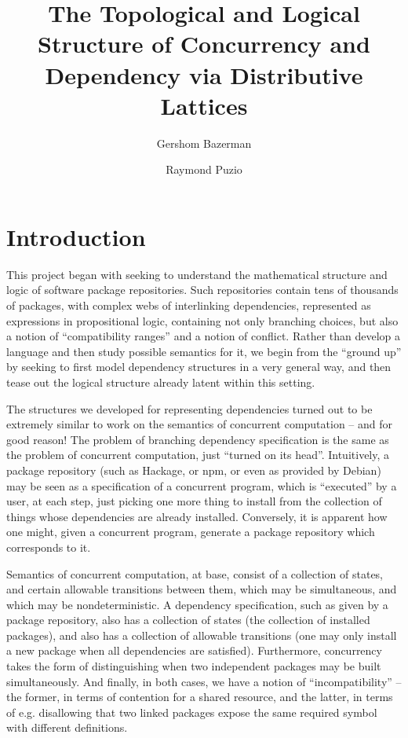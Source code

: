 \documentclass[hoptionsi,review,screen,format=acmsmall]{acmart}
\title[Concurrency and Dependency via Distributive Lattices]{The Topological and Logical Structure of Concurrency and Dependency via Distributive Lattices}
\author{Gershom Bazerman}
\affiliation{%
   \institution{Awake Security}}
\author{Raymond Puzio}
\affiliation{%
   \institution{Albert Einstein Institute}}
\theoremstyle{definition}
\begin{document}
\maketitle

\section{Introduction}
This project began with seeking to understand the mathematical structure and logic of software package repositories. Such repositories contain tens of thousands of packages, with complex webs of interlinking dependencies, represented as expressions in propositional logic, containing not only branching choices, but also a notion of ``compatibility ranges'' and a notion of conflict. Rather than develop a language and then study possible semantics for it, we begin from the ``ground up'' by seeking to first model dependency structures in a very general way, and then tease out the logical structure already latent within this setting.

The structures we developed for representing dependencies turned out to be extremely similar to work on the semantics of concurrent computation -- and for good reason! The problem of branching dependency specification is the same as the problem of concurrent computation, just ``turned on its head''. Intuitively, a package repository (such as Hackage, or npm, or even as provided by Debian) may be seen as a specification of a concurrent program, which is ``executed'' by a user, at each step, just picking one more thing to install from the collection of things whose dependencies are already installed. Conversely, it is apparent how one might, given a concurrent program, generate a package repository which corresponds to it.

Semantics of concurrent computation, at base, consist of a collection of states, and certain allowable transitions between them, which may be simultaneous, and which may be nondeterministic. A dependency specification, such as given by a package repository, also has a collection of states (the collection of installed packages), and also has a collection of allowable transitions (one may only install a new package when all dependencies are satisfied). Furthermore, concurrency takes the form of distinguishing when two independent packages may be built simultaneously. And finally, in both cases, we have a notion of ``incompatibility'' -- the former, in terms of contention for a shared resource, and the latter, in terms of e.g. disallowing that two linked packages expose the same required symbol with different definitions.
\end{document}
